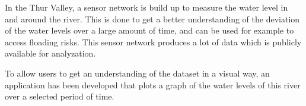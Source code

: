 In the Thur Valley, a sensor network is build up to measure the water level in and around the river. This is done to get a better understanding of the deviation of the water levels over a large amount of time, and can be used for example to access floading risks. This sensor network produces a lot of data which is publicly available for analyzation. 

To allow users to get an understanding of the dataset in a visual way, an application has been developed that plots a graph of the water levels of this river over a selected period of time.
